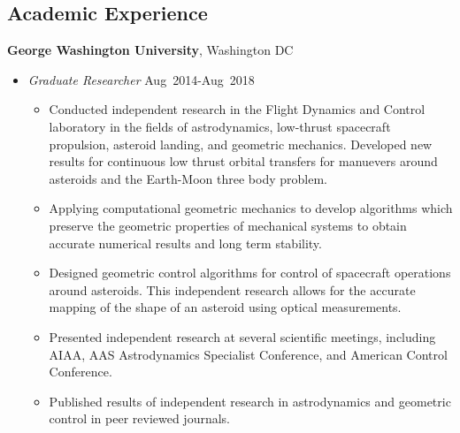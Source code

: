 
\subsection*{Academic Experience}
{}

\textbf{George Washington University}, Washington DC
    \begin{itemize}
        \item[] \textit{Graduate Researcher} \hfill {Aug~2014-Aug~2018}
        \begin{itemize}
            \item Conducted independent research in the Flight Dynamics and Control laboratory in the fields of astrodynamics, low-thrust spacecraft propulsion, asteroid landing, and geometric mechanics.
            Developed new results for continuous low thrust orbital transfers for manuevers around asteroids and the Earth-Moon three body problem.
            \item Applying computational geometric mechanics to develop algorithms which preserve the geometric properties of mechanical systems to obtain accurate numerical results and long term stability.
            \item Designed geometric control algorithms for control of spacecraft operations around asteroids.
                This independent research allows for the accurate mapping of the shape of an asteroid using optical measurements.
        \item Presented independent research at several scientific meetings, including AIAA, AAS Astrodynamics Specialist Conference, and American Control Conference.
        \item Published results of independent research in astrodynamics and geometric control in peer reviewed journals.

\end{itemize}
\end{itemize}

